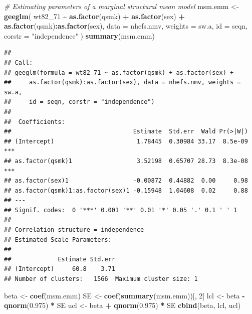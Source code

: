 \documentclass[
  10pt,
]{book}
\newenvironment{Shaded}{\begin{snugshade}}{\end{snugshade}}
\newcommand{\CommentTok}[1]{\textcolor[rgb]{0.56,0.35,0.01}{\textit{#1}}}
\newcommand{\DataTypeTok}[1]{\textcolor[rgb]{0.13,0.29,0.53}{#1}}
\newcommand{\DecValTok}[1]{\textcolor[rgb]{0.00,0.00,0.81}{#1}}
\newcommand{\FloatTok}[1]{\textcolor[rgb]{0.00,0.00,0.81}{#1}}
\newcommand{\KeywordTok}[1]{\textcolor[rgb]{0.13,0.29,0.53}{\textbf{#1}}}
\newcommand{\NormalTok}[1]{#1}
\newcommand{\OperatorTok}[1]{\textcolor[rgb]{0.81,0.36,0.00}{\textbf{#1}}}
\newcommand{\StringTok}[1]{\textcolor[rgb]{0.31,0.60,0.02}{#1}}
\begin{document}
\begin{Shaded}
\begin{Highlighting}[]
\CommentTok{\# Estimating parameters of a marginal structural mean model}
\NormalTok{msm.emm \textless{}{-}}\StringTok{ }\KeywordTok{geeglm}\NormalTok{(}
\NormalTok{  wt82\_}\DecValTok{71} \OperatorTok{\textasciitilde{}}\StringTok{ }\KeywordTok{as.factor}\NormalTok{(qsmk) }\OperatorTok{+}\StringTok{ }\KeywordTok{as.factor}\NormalTok{(sex)}
  \OperatorTok{+}\StringTok{ }\KeywordTok{as.factor}\NormalTok{(qsmk)}\OperatorTok{:}\KeywordTok{as.factor}\NormalTok{(sex),}
  \DataTypeTok{data =}\NormalTok{ nhefs.nmv,}
  \DataTypeTok{weights =}\NormalTok{ sw.a,}
  \DataTypeTok{id =}\NormalTok{ seqn,}
  \DataTypeTok{corstr =} \StringTok{"independence"}
\NormalTok{)}
\KeywordTok{summary}\NormalTok{(msm.emm)}
\end{Highlighting}
\end{Shaded}

\begin{verbatim}
## 
## Call:
## geeglm(formula = wt82_71 ~ as.factor(qsmk) + as.factor(sex) + 
##     as.factor(qsmk):as.factor(sex), data = nhefs.nmv, weights = sw.a, 
##     id = seqn, corstr = "independence")
## 
##  Coefficients:
##                                  Estimate  Std.err  Wald Pr(>|W|)    
## (Intercept)                       1.78445  0.30984 33.17  8.5e-09 ***
## as.factor(qsmk)1                  3.52198  0.65707 28.73  8.3e-08 ***
## as.factor(sex)1                  -0.00872  0.44882  0.00     0.98    
## as.factor(qsmk)1:as.factor(sex)1 -0.15948  1.04608  0.02     0.88    
## ---
## Signif. codes:  0 '***' 0.001 '**' 0.01 '*' 0.05 '.' 0.1 ' ' 1
## 
## Correlation structure = independence 
## Estimated Scale Parameters:
## 
##             Estimate Std.err
## (Intercept)     60.8    3.71
## Number of clusters:   1566  Maximum cluster size: 1
\end{verbatim}

\begin{Shaded}
\begin{Highlighting}[]
\NormalTok{beta \textless{}{-}}\StringTok{ }\KeywordTok{coef}\NormalTok{(msm.emm)}
\NormalTok{SE \textless{}{-}}\StringTok{ }\KeywordTok{coef}\NormalTok{(}\KeywordTok{summary}\NormalTok{(msm.emm))[, }\DecValTok{2}\NormalTok{]}
\NormalTok{lcl \textless{}{-}}\StringTok{ }\NormalTok{beta }\OperatorTok{{-}}\StringTok{ }\KeywordTok{qnorm}\NormalTok{(}\FloatTok{0.975}\NormalTok{) }\OperatorTok{*}\StringTok{ }\NormalTok{SE}
\NormalTok{ucl \textless{}{-}}\StringTok{ }\NormalTok{beta }\OperatorTok{+}\StringTok{ }\KeywordTok{qnorm}\NormalTok{(}\FloatTok{0.975}\NormalTok{) }\OperatorTok{*}\StringTok{ }\NormalTok{SE}
\KeywordTok{cbind}\NormalTok{(beta, lcl, ucl)}
\end{Highlighting}
\end{Shaded}
\end{document}
